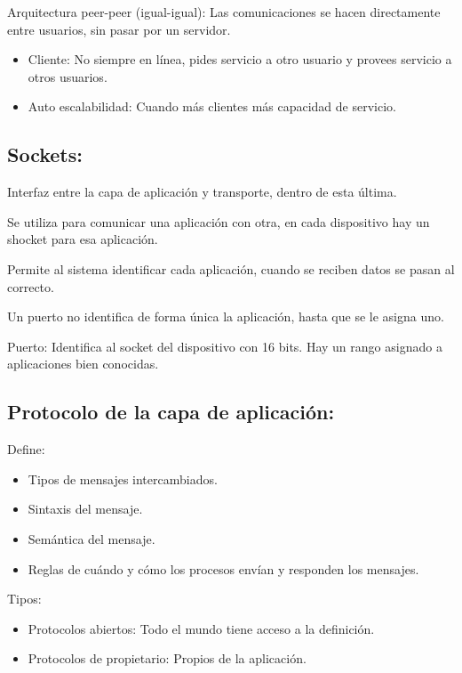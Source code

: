 \documentclass[12pt, twoside, openright]{report} %
\begin{document}
	Arquitectura peer-peer (igual-igual): Las comunicaciones se hacen
    directamente entre usuarios, sin pasar por un servidor.

    \begin{itemize}
    \item
      Cliente: No siempre en línea, pides servicio a otro usuario y
      provees servicio a otros usuarios.
    \item
      Auto escalabilidad: Cuando más clientes más capacidad de servicio.
    \end{itemize}

\subsection{Sockets:}


    Interfaz entre la capa de aplicación y transporte, dentro de esta
    última.

	Se utiliza para comunicar una aplicación con otra, en cada
    dispositivo hay un shocket para esa aplicación.

	Permite al sistema identificar cada aplicación, cuando se reciben
    datos se pasan al correcto.

	Un puerto no identifica de forma única la aplicación, hasta que se
    le asigna uno.

	Puerto: Identifica al socket del dispositivo con 16 bits. Hay un
    rango asignado a aplicaciones bien conocidas.

\subsection{Protocolo de la capa de aplicación:}

    Define:

    \begin{itemize}
    \item
      Tipos de mensajes intercambiados.
    \item
      Sintaxis del mensaje.
    \item
      Semántica del mensaje.
    \item
      Reglas de cuándo y cómo los procesos envían y responden los
      mensajes.
    \end{itemize}

	Tipos:

    \begin{itemize}
    \item
      Protocolos abiertos: Todo el mundo tiene acceso a la definición.
    \item
      Protocolos de propietario: Propios de la aplicación.
    \end{itemize}
\end{document}
